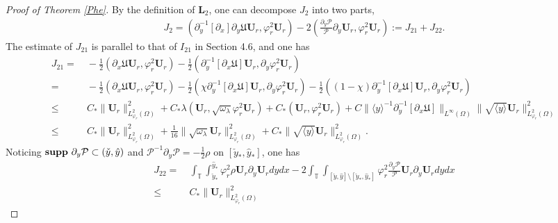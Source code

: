 \documentclass{amsart}
\numberwithin{equation}{section}
\newcommand\y{{{\langle y \rangle}}}
\begin{document}
\begin{proof}[Proof of Theorem \ref{Phe}]
By the definition of $\mathbf{L}_{2}$, one can decompose $J_{2}$ into two parts,
\begin{align*}
J_{2}
= (\partial_{y}^{-1}[\partial_{x}]\partial_{y}\mathfrak{U}\mathbf{U}_{r},\varphi_{r}^{2}\mathbf{U}_{r})
 -2\left(\frac{\partial_{y}\mathcal{P}}{\mathcal{P}} \partial_{y}\mathbf{U}_{r},\varphi_{r}^{2}\mathbf{U}_{r}\right)
:=J_{21}+J_{22}.
\end{align*}
The estimate of $J_{21}$ is parallel to that of $I_{21}$ in Section 4.6, and one has
\begin{align*}
J_{21}
=&~-\frac{1}{2}(\partial_{x}\mathfrak{U}\mathbf{U}_{r},\varphi_{r}^{2}\mathbf{U}_{r})
  -\frac{1}{2}(\partial_{y}^{-1}\left[\partial_{x}\mathfrak{U}\right]\mathbf{U}_{r},\partial_{y}\varphi_{r}^{2}\mathbf{U}_{r})\\
=&~-\frac{1}{2}(\partial_{x}\mathfrak{U}\mathbf{U}_{r},\varphi_{r}^{2}\mathbf{U}_{r})
  -\frac{1}{2}(\chi\partial_{y}^{-1}\left[\partial_{x}\mathfrak{U}\right]\mathbf{U}_{r},\partial_{y}\varphi_{r}^{2}\mathbf{U}_{r})
  -\frac{1}{2}((1-\chi)\partial_{y}^{-1}\left[\partial_{x}\mathfrak{U}\right]\mathbf{U}_{r},\partial_{y}\varphi_{r}^{2}\mathbf{U}_{r})\\
\leq&~C_{*}\|\mathbf{U}_{r}\|_{L_{\varphi_{r}}^{2}(\Omega)}^{2}
     +C_{*}\lambda(\mathbf{U}_{r},\sqrt{\omega_{\lambda}}\varphi_{r}^{2}\mathbf{U}_{r})
     +C_{*}(\mathbf{U}_{r},\varphi_{r}^{2}\mathbf{U}_{r})
     +C\|\y^{-1}\partial_{y}^{-1}\left[\partial_{x}\mathfrak{U}\right]\|_{L^{\infty}(\Omega)}
       \|\sqrt{\y}\mathbf{U}_{r}\|_{L_{\varphi_{r}}^{2}(\Omega)}^{2}\\
\leq&~C_{*}\|\mathbf{U}_{r}\|_{L_{\varphi_{r}}^{2}(\Omega)}^{2}
     +\frac{1}{16}\|\sqrt{\omega_{\lambda}}\mathbf{U}_{r}\|_{L_{\varphi_{r}}^{2}(\Omega)}^{2}
     +C_{*}\|\sqrt{\y}\mathbf{U}_{r}\|_{L_{\varphi_{r}}^{2}(\Omega)}^{2}.
\end{align*}
Noticing ${\bf supp}~\partial_{y}\mathcal{P}\subset(\check{y},\hat{y})$ and $\mathcal{P}^{-1}\partial_{y}\mathcal{P}=-\frac{1}{2}\rho$ on $[\check{y}_{*},\hat{y}_{*}]$, one has
\begin{align*}
J_{22}
=&~\int_{\mathbb{T}}\int_{\check{y}_{*}}^{\hat{y}_{*}}\varphi_{r}^{2}\rho\mathbf{U}_{r}\partial_{y}\mathbf{U}_{r}dydx
  -2\int_{\mathbb{T}}\int_{[\check{y},\hat{y}]\setminus[\check{y}_{*},\hat{y}_{*}]}\varphi_{r}^{2}\frac{\partial_{y}\mathcal{P}}{\mathcal{P}}\mathbf{U}_{r}\partial_{y}\mathbf{U}_{r}dydx\\
\leq&~C_{*}\|\mathbf{U}_{r}\|_{L_{\varphi_{r}}^{2}(\Omega)}^{2}

\end{align*}
\end{proof}
\end{document}
